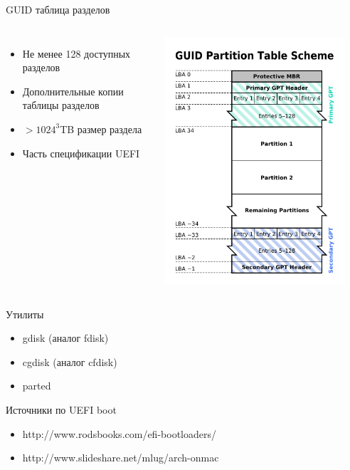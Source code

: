 \begin{frame}{GUID таблица разделов}

   \begin{columns}
      \begin{itemize}
        \item{Не менее 128 доступных разделов}
        \item{Дополнительные копии таблицы разделов}
        \item{$>1024^3$TB размер раздела}
        \item{Часть спецификации UEFI}
      \end{itemize}
      \includegraphics[width=0.9\textwidth]{../../slides/disk/gpt.png}
  \end{columns}
\end{frame}
\begin{frame}{Утилиты}
  \begin{itemize}
    \item gdisk (аналог fdisk)
    \item cgdisk (аналог cfdisk)
    \item parted
  \end{itemize}
\end{frame}

\begin{frame}{Источники по UEFI boot}
  \begin{itemize}
    \item http://www.rodsbooks.com/efi-bootloaders/
    \item http://www.slideshare.net/mlug/arch-onmac 
  \end{itemize}
\end{frame}
